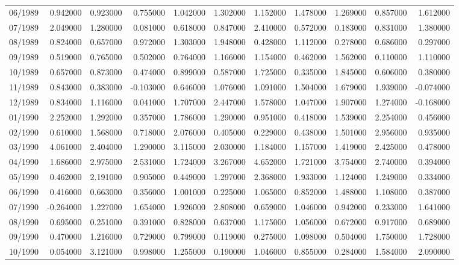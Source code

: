 \begin{tabular}{lrrrrrrrrrr}
06/1989 & 0.942000 & 0.923000 & 0.755000 & 1.042000 & 1.302000 & 1.152000 & 1.478000 & 1.269000 & 0.857000 & 1.612000 \\
07/1989 & 2.049000 & 1.280000 & 0.081000 & 0.618000 & 0.847000 & 2.410000 & 0.572000 & 0.183000 & 0.831000 & 1.380000 \\
08/1989 & 0.824000 & 0.657000 & 0.972000 & 1.303000 & 1.948000 & 0.428000 & 1.112000 & 0.278000 & 0.686000 & 0.297000 \\
09/1989 & 0.519000 & 0.765000 & 0.502000 & 0.764000 & 1.166000 & 1.154000 & 0.462000 & 1.562000 & 0.110000 & 1.110000 \\
10/1989 & 0.657000 & 0.873000 & 0.474000 & 0.899000 & 0.587000 & 1.725000 & 0.335000 & 1.845000 & 0.606000 & 0.380000 \\
11/1989 & 0.843000 & 0.383000 & -0.103000 & 0.646000 & 1.076000 & 1.091000 & 1.504000 & 1.679000 & 1.939000 & -0.074000 \\
12/1989 & 0.834000 & 1.116000 & 0.041000 & 1.707000 & 2.447000 & 1.578000 & 1.047000 & 1.907000 & 1.274000 & -0.168000 \\
01/1990 & 2.252000 & 1.292000 & 0.357000 & 1.786000 & 1.290000 & 0.951000 & 0.418000 & 1.539000 & 2.254000 & 0.456000 \\
02/1990 & 0.610000 & 1.568000 & 0.718000 & 2.076000 & 0.405000 & 0.229000 & 0.438000 & 1.501000 & 2.956000 & 0.935000 \\
03/1990 & 4.061000 & 2.404000 & 1.290000 & 3.115000 & 2.030000 & 1.184000 & 1.157000 & 1.419000 & 2.425000 & 0.478000 \\
04/1990 & 1.686000 & 2.975000 & 2.531000 & 1.724000 & 3.267000 & 4.652000 & 1.721000 & 3.754000 & 2.740000 & 0.394000 \\
05/1990 & 0.462000 & 2.191000 & 0.905000 & 0.449000 & 1.297000 & 2.368000 & 1.933000 & 1.124000 & 1.249000 & 0.334000 \\
06/1990 & 0.416000 & 0.663000 & 0.356000 & 1.001000 & 0.225000 & 1.065000 & 0.852000 & 1.488000 & 1.108000 & 0.387000 \\
07/1990 & -0.264000 & 1.227000 & 1.654000 & 1.926000 & 2.808000 & 0.659000 & 1.046000 & 0.942000 & 0.233000 & 1.641000 \\
08/1990 & 0.695000 & 0.251000 & 0.391000 & 0.828000 & 0.637000 & 1.175000 & 1.056000 & 0.672000 & 0.917000 & 0.689000 \\
09/1990 & 0.470000 & 1.216000 & 0.729000 & 0.799000 & 0.119000 & 0.275000 & 1.098000 & 0.504000 & 1.750000 & 1.728000 \\
10/1990 & 0.054000 & 3.121000 & 0.998000 & 1.255000 & 0.190000 & 1.046000 & 0.855000 & 0.284000 & 1.584000 & 2.090000 \\

\end{tabular}
